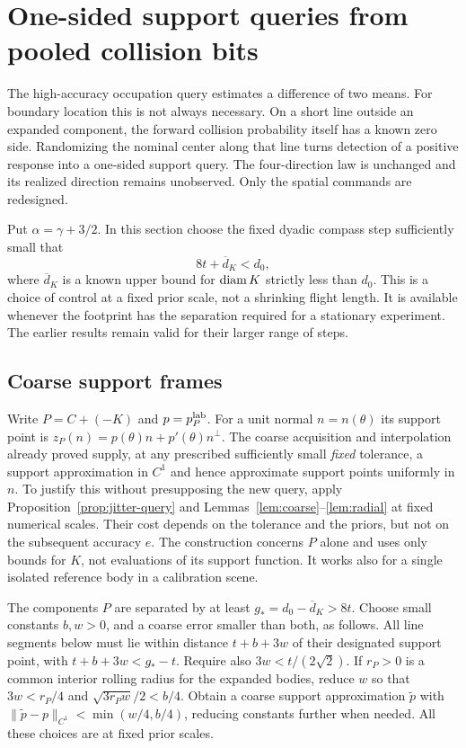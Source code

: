 \section{One-sided support queries from pooled collision bits}
\label{sec:one-sided}
The high-accuracy occupation query estimates a difference of two means.
For boundary location this is not always necessary. On a short line
outside an expanded component, the forward collision probability itself
has a known zero side. Randomizing the nominal center along that line
turns detection of a positive response into a one-sided support query.
The four-direction law is unchanged and its realized direction remains
unobserved. Only the spatial commands are redesigned.

Put $\alpha=\gamma+3/2$. In this section choose the fixed dyadic
compass step sufficiently small that
\begin{equation}\label{eq:line-step}
                  8t+\overline d_K<d_0,
\end{equation}
where $\overline d_K$ is a known upper bound for $\operatorname{diam} K$ strictly
less than $d_0$. This is a choice of control at a fixed prior scale,
not a shrinking flight length. It is available whenever the footprint
has the separation required for a stationary experiment. The earlier
results remain valid for their larger range of steps.

\subsection{Coarse support frames}
Write $P=C+(-K)$ and $p=p_P^{\rm lab}$. For a unit normal
$n=n(\theta)$ its support point is
$z_P(n)=p(\theta)n+p'(\theta)n^\perp$. The coarse acquisition and
interpolation already proved supply, at any prescribed sufficiently
small \emph{fixed} tolerance, a support approximation in $C^1$ and
hence approximate support points uniformly in $n$. To justify this
without presupposing the new query, apply Proposition~\ref{prop:jitter-query}
and Lemmas~\ref{lem:coarse}--\ref{lem:radial} at fixed numerical scales.
Their cost depends on the tolerance and the priors, but not on the
subsequent accuracy $e$. The construction concerns $P$ alone and uses
only bounds for $K$, not evaluations of its support function. It works
also for a single isolated reference body in a calibration scene.

The components $P$ are separated by at least
$g_*=d_0-\overline d_K>8t$. Choose small constants $b,w>0$, and a
coarse error smaller than both, as follows. All line segments below
must lie within distance $t+b+3w$ of their designated support point,
with $t+b+3w<g_*-t$. Require also $3w<t/(2\sqrt2)$.
If $r_P>0$ is a common interior rolling radius for the expanded
bodies, reduce $w$ so that $3w<r_P/4$ and
$\sqrt{3r_Pw}/2<b/4$. Obtain a coarse support approximation
$\widetilde p$ with
$\|\widetilde p-p\|_{C^1}<\min(w/4,b/4)$, reducing constants further
when needed. All these choices are at fixed prior scales.

